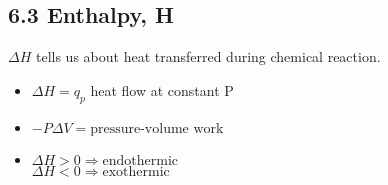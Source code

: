 \subsection{6.3 Enthalpy, H}
    $\Delta H$ tells us about heat transferred during chemical reaction.
    \begin{itemize}
        \item $\Delta H = q_p$ heat flow at constant P
        \item $-P \Delta V = \text{pressure-volume work}$
        \item $\Delta H > 0 \Rightarrow \text{endothermic}$\\
              $\Delta H < 0 \Rightarrow \text{exothermic}$
    \end{itemize}
